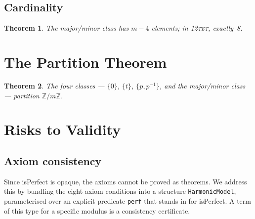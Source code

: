 \documentclass{amsart}
\newtheorem{theorem}{Theorem}[section]
\begin{document}


\subsection*{Cardinality}

\begin{theorem}
The major/minor class has $m - 4$ elements; in \textsc{12tet}, exactly~8.
\end{theorem}



\section{The Partition Theorem}
\label{sec:partition}

\begin{theorem}
The four classes --- $\{0\}$, $\{t\}$, $\{p, p^{-1}\}$, and the
major/minor class --- partition $\mathbb{Z}/m\mathbb{Z}$.
\end{theorem}



\section{Risks to Validity}
\label{sec:risks}

\subsection*{Axiom consistency}

Since \textsf{isPerfect} is opaque, the axioms cannot be proved as theorems.
We address this by bundling the eight axiom conditions into a structure
\texttt{HarmonicModel}, parameterised over an explicit predicate \texttt{perf}
that stands in for \textsf{isPerfect}.  A term of this type for a specific
modulus is a consistency certificate.
\end{document}
